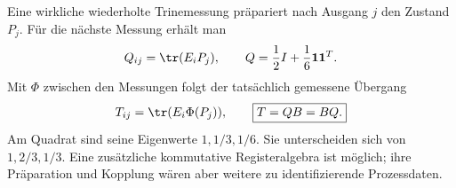 Eine wirkliche wiederholte Trinemessung präpariert nach Ausgang $j$ den Zustand $P_j$. Für die nächste Messung erhält man
\begin{equation}
Q_{ij}=\tr(E_iP_j),\qquad
Q=\frac12I+\frac16\mathbf1\mathbf1^T.
\end{equation}
Mit $\Phi$ zwischen den Messungen folgt der tatsächlich gemessene Übergang
\begin{equation}
T_{ij}=\tr(E_i\Phi(P_j)),\qquad
\boxed{T=QB=BQ.}
\end{equation}
Am Quadrat sind seine Eigenwerte $1,1/3,1/6$.
Sie unterscheiden sich von $1,2/3,1/3$.
Eine zusätzliche kommutative Registeralgebra ist möglich; ihre Präparation und Kopplung wären aber weitere zu identifizierende Prozessdaten.

